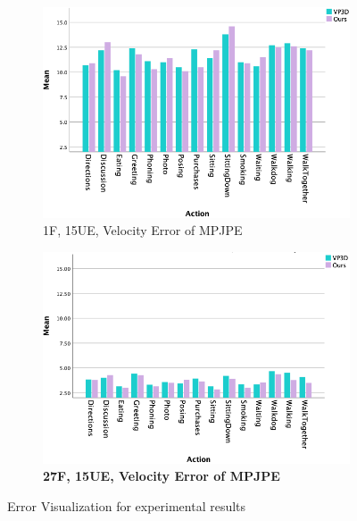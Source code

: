 \documentclass[10pt,twocolumn,letterpaper]{article}
\begin{document}
\begin{figure}
\begin{subfigure}[b]{0.49\textwidth}
         \includegraphics[width=\textwidth]{mean_error_comparison_3.png}
         \caption{1F, 15UE, Velocity Error of MPJPE}
         \label{fig:est_c}
     \end{subfigure}
     \hfill
     \begin{subfigure}[b]{0.49\textwidth}
         \centering
         \includegraphics[width=\textwidth]{mean_error_comparison_4.png}
         \caption{\textbf{27F, 15UE, Velocity Error of MPJPE}}
         \label{fig:est_d}
     \end{subfigure}
     \hfill
        \caption{Error Visualization for experimental results}
        \label{fig:four_error_graphs}
\end{figure}



\end{document}
